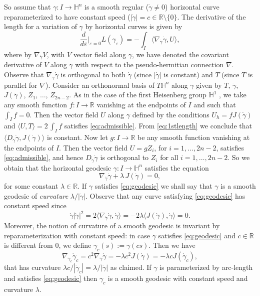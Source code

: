 \documentclass[10pt]{amsart}
\theoremstyle{definition}
\theoremstyle{remark}
\numberwithin{equation}{section}
\begin{document}
So assume that ${\gamma}:I\to{{\mathbb{H}}}^n$ is a smooth regular ($\dot{\gamma}\neq 0$) horizontal curve reparameterized to have constant speed ($|{\dot{\gamma}}|=c\in{{\mathbb{R}}}\setminus\{0\}$. The derivative of the length for a variation of ${\gamma}$ by horizontal curves is given by
\begin{equation}
\label{eq:1stlength}
\frac{d}{d{\varepsilon}}\bigg|_{{\varepsilon}=0} 
L({\gamma}_{\varepsilon})=-\int_{I}{\langle{\nabla_{\dot{\gamma}}\dot{\gamma},U}\rangle},
\end{equation}
where by $\nabla_{\dot{\gamma}}V$, with $V$ vector field along ${\gamma}$, we have denoted the covariant derivative of $V$ along ${\gamma}$ with respect to the pseudo-hermitian connection $\nabla$. Observe that $\nabla_{\dot{\gamma}}\dot{\gamma}$ is orthogonal to both $\dot{\gamma}$ (since $|{\dot{\gamma}}|$ is constant) and $T$ (since $T$ is parallel for $\nabla$).  Consider an orthonormal basis of $T{{\mathbb{H}}}^n$ along ${\gamma}$ given by $T$, $\dot{\gamma}$, $J(\dot{\gamma})$, $Z_{1}$, $\ldots$, $Z_{2n-2}$.  As in the case of the first Heisenberg group ${{\mathbb{H}}}^1$ \cite[\S~3]{MR2271950}, we take any smooth function $f:I\to{{\mathbb{R}}}$ vanishing at the endpoints of $I$ and such that $\int_{I}f=0$.  Then the vector field $U$ along ${\gamma}$ defined by the conditions $U_{h}=fJ(\dot{\gamma})$ and ${\langle{U,T}\rangle}=2\,\int_{I} f$ satisfies \eqref{eq:admissible}.  From \eqref{eq:1stlength} we conclude that ${\langle{D_{\dot{\gamma}}\dot{\gamma},J(\dot{\gamma})}\rangle}$ is constant.  Now let $g:I\to{{\mathbb{R}}}$ be any smooth function vanishing at the endpoints of $I$.  Then the vector field $U=gZ_{i}$, for $i=1,\ldots,2n-2$, satisfies \eqref{eq:admissible}, and hence $D_{\dot{\gamma}}\dot{\gamma}$ is orthogonal to $Z_{i}$ for all $i=1,\ldots,2n-2$.  So we obtain that the horizontal geodesic ${\gamma}:I\to{{\mathbb{H}}}^n$ satisfies the equation
\begin{equation}
\label{eq:geodesic}
\nabla_{\dot{\gamma}}\dot{\gamma}+{\lambda}\,J(\dot{\gamma})=0,
\end{equation}
for some constant ${\lambda}\in{{\mathbb{R}}}$.  If ${\gamma}$ satisfies \eqref{eq:geodesic} we shall say that ${\gamma}$ is a smooth geodesic of \emph{curvature} ${\lambda}/|{\dot{\gamma}}|$. Observe that any curve satisfying \eqref{eq:geodesic} has constant speed since 
\[
{\dot{\gamma}}|{\dot{\gamma}}|^2=2{\langle{\nabla_{\dot{\gamma}}{\dot{\gamma}},{\dot{\gamma}}}\rangle}=-2{\lambda}{\langle{J({\dot{\gamma}}),{\dot{\gamma}}}\rangle}=0.
\]
Moreover, the notion of curvature of a smooth geodesic is invariant by reparameterization with constant speed: in case ${\gamma}$ satisfies \eqref{eq:geodesic} and $c\in{{\mathbb{R}}}$ is different from $0$, we define ${\gamma}_c(s):={\gamma}(cs)$. Then we have
\[
\nabla_{{\dot{\gamma}}_c}{{\dot{\gamma}}_c}=c^2\nabla_{\dot{\gamma}} {\dot{\gamma}}=-{\lambda} c^2J({\dot{\gamma}})=-{\lambda} cJ({\dot{\gamma}}_c),
\]
that has curvature ${\lambda} c/|{\dot{\gamma}}_c|={\lambda}/|{\dot{\gamma}}|$ as claimed. If ${\gamma}$ is parameterized by arc-length and satisfies \eqref{eq:geodesic} then ${\gamma}_c$ is a smooth geodesic with constant speed and curvature ${\lambda}$.
\end{document}
